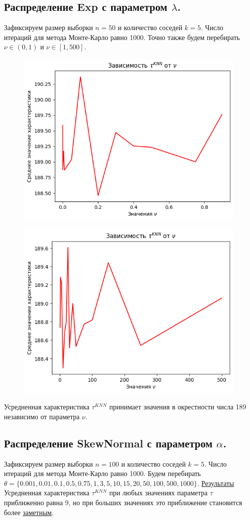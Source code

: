\documentclass{report}
\begin{document}
\subsection{Распределение Exp с параметром $\lambda$.}
Зафиксируем размер выборки $n = 50$ и количество соседей $k = 5$. Число итераций для метода Монте-Карло равно 1000.
\newline
\newline
Точно также будем перебирать $\nu \in (0, 1)$ и $\nu \in [1, 500]$.
\begin{figure}[h]
    \centering
    \includegraphics[width=0.5\linewidth]{3.png}
\end{figure}
\begin{figure}[h]
    \centering
    \includegraphics[width=0.5\linewidth]{4.png}
\end{figure}
\newline
\newline
Усредненная характеристика $\tau^{KNN}$ принимает значения в окрестности числа 189 независимо от параметра $\nu$.

\subsection{Распределение SkewNormal с параметром $\alpha$.}
Зафиксируем размер выборки $n = 100$ и количество соседей $k = 5$. Число итераций для метода Монте-Карло равно 1000.
\newline
\newline
Будем перебирать $\theta = \{0.001, 0.01, 0.1, 0.5, 0.75, 1, 3, 5, 10, 15, 20, 50, 100, 500, 1000\}$.
\newline
\newline
\href{https://github.com/misshimichka/dm-random-graphs/blob/fbf3dd1bec269816312776019ca766ef0ce871b6/report/fix_construct_skewnorm_max_deg_knn.png}{Результаты}
\newline
\newline
Усредненная характеристика $\tau^{KNN}$ при любых значениях параметра $\tau$ приближенно равна 9, но при больших значениях это приближение становится более \href{https://github.com/misshimichka/dm-random-graphs/blob/dmitrii/report/report/fix_construct_skewnorm_alpha2avg_max_deg_knn.png}{заметным}. 
\end{document}
